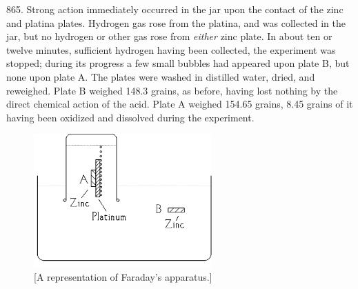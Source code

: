 865. Strong action immediately occurred in the jar upon the contact of
the zinc and platina plates. Hydrogen gas rose from the platina, and was
collected in the jar, but no hydrogen or other gas rose from
\emph{either} zinc plate. In about ten or twelve minutes, sufficient
hydrogen having been collected, the experiment was stopped; during its
progress a few small bubbles had appeared upon plate B, but none upon
plate A. The plates were washed in distilled water, dried, and
reweighed. Plate B weighed 148.3 grains, as before, having lost nothing
by the direct chemical action of the acid. Plate A weighed 154.65
grains, 8.45 grains of it having been oxidized and dissolved during the
experiment.
\begin{figure}
  \centering
    \includegraphics[width=2.68681in,height=2.00903in]{images/01_faraday/image001.png}
    \caption*{{[}A representation of Faraday's ap\-pa\-ra\-tus.{]}}
\end{figure}

